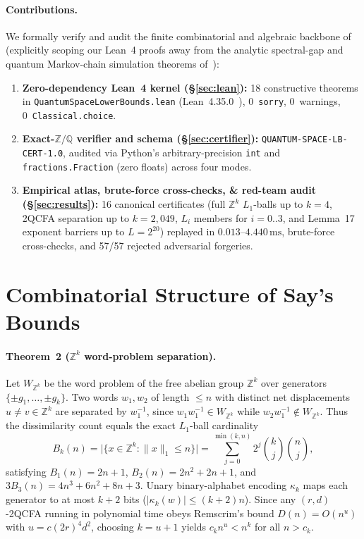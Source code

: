 \documentclass[11pt,twocolumn]{article}
\newcommand{\ZZ}{\mathbb{Z}}
\newcommand{\QQ}{\mathbb{Q}}
\begin{document}
\paragraph{Contributions.}
We formally verify and audit the finite combinatorial and algebraic backbone of~\cite{say2026quantumspace} (explicitly scoping our Lean~4 proofs away from the analytic spectral-gap and quantum Markov-chain simulation theorems of~\cite{remscrim2021lower,say2026quantumspace}):
\begin{enumerate}[leftmargin=*,nosep]
  \item \textbf{Zero-dependency Lean~4 kernel (\S\ref{sec:lean}):} 18 constructive theorems in \texttt{QuantumSpaceLowerBounds.lean} (Lean~4.35.0~\cite{demoura2021lean4}), 0~\texttt{sorry}, 0~warnings, 0~\texttt{Classical.choice}.
  \item \textbf{Exact-$\ZZ/\QQ$ verifier and schema (\S\ref{sec:certifier}):} \texttt{QUANTUM-SPACE-LB-CERT-1.0}, audited via Python's arbitrary-precision \texttt{int} and \texttt{fractions.Fraction} (zero floats) across four modes.
  \item \textbf{Empirical atlas, brute-force cross-checks, \& red-team audit (\S\ref{sec:results}):} 16 canonical certificates (full $\ZZ^k$ $L_1$-balls up to $k=4$, 2QCFA separation up to $k=2{,}049$, $L_i$ members for $i=0..3$, and Lemma~17 exponent barriers up to $L=2^{20}$) replayed in $0.013$--$4.440\,\mathrm{ms}$, brute-force cross-checks, and 57/57 rejected adversarial forgeries.
\end{enumerate}

\section{Combinatorial Structure of Say's Bounds}\label{sec:prelim}
\paragraph{Theorem~2 ($\ZZ^k$ word-problem separation).}
Let $W_{\ZZ^k}$ be the word problem of the free abelian group $\ZZ^k$ over generators $\{\pm g_1,\dots,\pm g_k\}$. Two words $w_1, w_2$ of length $\le n$ with distinct net displacements $u \neq v \in \ZZ^k$ are separated by $w_1^{-1}$, since $w_1 w_1^{-1} \in W_{\ZZ^k}$ while $w_2 w_1^{-1} \notin W_{\ZZ^k}$. Thus the dissimilarity count equals the exact $L_1$-ball cardinality
\begin{equation}
  B_k(n) = \bigl|\{x\!\in\!\ZZ^k : \|x\|_1\!\le\! n\}\bigr| = \!\sum_{j=0}^{\min(k,n)}\! 2^j \binom{k}{j}\binom{n}{j},
  \label{eq:ball}
\end{equation}
satisfying $B_1(n) = 2n+1$, $B_2(n) = 2n^2+2n+1$, and $3B_3(n) = 4n^3 + 6n^2 + 8n + 3$. Unary binary-alphabet encoding $\kappa_k$ maps each generator to at most $k+2$ bits ($|\kappa_k(w)| \le (k+2)n$). Since any $(r,d)$-2QCFA running in polynomial time obeys Remscrim's bound $D(n) = O(n^u)$ with $u = c(2r)^4 d^2$, choosing $k = u + 1$ yields $c_k n^u < n^k$ for all $n > c_k$.
\end{document}
